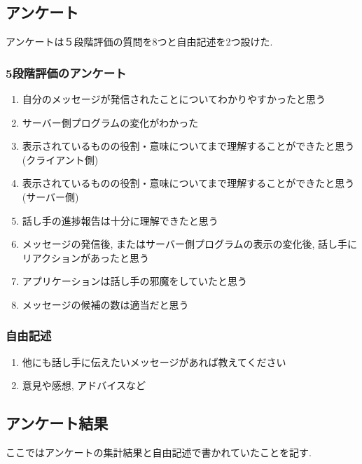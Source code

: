 \documentclass{funthesis}
\begin{document}
\subsection{アンケート}
アンケートは５段階評価の質問を8つと自由記述を2つ設けた. \\
\subsubsection{5段階評価のアンケート}
\begin{enumerate}
 \item 自分のメッセージが発信されたことについてわかりやすかったと思う
 \item サーバー側プログラムの変化がわかった
 \item 表示されているものの役割・意味についてまで理解することができたと思う(クライアント側) 
 \item 表示されているものの役割・意味についてまで理解することができたと思う(サーバー側)
 \item 話し手の進捗報告は十分に理解できたと思う 
 \item メッセージの発信後, またはサーバー側プログラムの表示の変化後, 話し手にリアクションがあったと思う
 \item アプリケーションは話し手の邪魔をしていたと思う
 \item メッセージの候補の数は適当だと思う
\end{enumerate}
\subsubsection{自由記述}
\begin{enumerate}
 \item 他にも話し手に伝えたいメッセージがあれば教えてください
 \item 意見や感想, アドバイスなど
\end{enumerate}


\subsection{アンケート結果}
ここではアンケートの集計結果と自由記述で書かれていたことを記す. 
\end{document}
